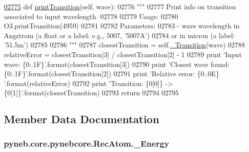 \begin{DoxyCode}
\hypertarget{classpyneb_1_1core_1_1pynebcore_1_1_rec_atom_l02775}{}\hyperlink{classpyneb_1_1core_1_1pynebcore_1_1_rec_atom_acdf8a7cf94fee8be8335e4651c318a30}{02775}     \textcolor{keyword}{def }\hyperlink{classpyneb_1_1core_1_1pynebcore_1_1_rec_atom_acdf8a7cf94fee8be8335e4651c318a30}{printTransition}(self, wave):
02776         \textcolor{stringliteral}{"""}
02777 \textcolor{stringliteral}{        Print info on transition associated to input wavelength.}
02778 \textcolor{stringliteral}{        }
02779 \textcolor{stringliteral}{        Usage:}
02780 \textcolor{stringliteral}{            O3.printTransition(4959)}
02781 \textcolor{stringliteral}{            }
02782 \textcolor{stringliteral}{        Parameters:}
02783 \textcolor{stringliteral}{            - wave      wavelength in Angstrom (a float or a label: e.g., 5007, '5007A') }
02784 \textcolor{stringliteral}{                or in micron (a label: '51.5m')}
02785 \textcolor{stringliteral}{                }
02786 \textcolor{stringliteral}{        """}
02787         closestTransition = self.\hyperlink{classpyneb_1_1core_1_1pynebcore_1_1_rec_atom_a32b31a371f3b6ecc5bbbc4d0c5d2a855}{\_Transition}(wave)
02788         relativeError = closestTransition[3] / closestTransition[2] - 1
02789         \textcolor{keywordflow}{print} \textcolor{stringliteral}{'Input wave: \{0:.1F\}'}.format(closestTransition[3])
02790         \textcolor{keywordflow}{print} \textcolor{stringliteral}{'Closest wave found: \{0:.1F\}'}.format(closestTransition[2])
02791         \textcolor{keywordflow}{print} \textcolor{stringliteral}{'Relative error: \{0:.0E\} '}.format(relativeError)
02792         \textcolor{keywordflow}{print} \textcolor{stringliteral}{'Transition: \{0[0]\} -> \{0[1]\}'}.format(closestTransition)
02793         \textcolor{keywordflow}{return}
02794     
02795               
\end{DoxyCode}


\subsection{Member Data Documentation}
\hypertarget{classpyneb_1_1core_1_1pynebcore_1_1_rec_atom_a652daa9311973780fd44f61e09bc650f}{}
\subsubsection[{\+\_\+\+Energy}]{\setlength{\rightskip}{0pt plus 5cm}pyneb.\+core.\+pynebcore.\+Rec\+Atom.\+\_\+\+Energy\hspace{0.3cm}{\ttfamily [private]}}\label{classpyneb_1_1core_1_1pynebcore_1_1_rec_atom_a652daa9311973780fd44f61e09bc650f}


